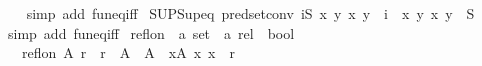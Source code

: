 \begin{isabellebody}
%
\isadelimproof
\ \ %
\endisadelimproof
%
\isatagproof
{}\isamarkupfalse%
\ {\isacharparenleft}{\kern0pt}simp\ add{\isacharcolon}{\kern0pt}\ fun{\isacharunderscore}{\kern0pt}eq{\isacharunderscore}{\kern0pt}iff{\isacharparenright}{\kern0pt}%
\endisatagproof
{\isafoldproof}%
%
\isadelimproof
\isanewline
%
\endisadelimproof
\isanewline
{}\isamarkupfalse%
\ SUP{\isacharunderscore}{\kern0pt}Sup{\isacharunderscore}{\kern0pt}eq{}\ {\isacharbrackleft}{\kern0pt}pred{\isacharunderscore}{\kern0pt}set{\isacharunderscore}{\kern0pt}conv{\isacharbrackright}{\kern0pt}{\isacharcolon}{\kern0pt}\ {\isachardoublequoteopen}{\isacharparenleft}{\kern0pt}{\isasymSqunion}i{\isasymin}S{\isachardot}{\kern0pt}\ {\isacharparenleft}{\kern0pt}{\isasymlambda}x\ y{\isachardot}{\kern0pt}\ {\isacharparenleft}{\kern0pt}x{\isacharcomma}{\kern0pt}\ y{\isacharparenright}{\kern0pt}\ {\isasymin}\ i{\isacharparenright}{\kern0pt}{\isacharparenright}{\kern0pt}\ {\isacharequal}{\kern0pt}\ {\isacharparenleft}{\kern0pt}{\isasymlambda}x\ y{\isachardot}{\kern0pt}\ {\isacharparenleft}{\kern0pt}x{\isacharcomma}{\kern0pt}\ y{\isacharparenright}{\kern0pt}\ {\isasymin}\ {\isasymUnion}S{\isacharparenright}{\kern0pt}{\isachardoublequoteclose}\isanewline
%
\isadelimproof
\ \ %
\endisadelimproof
%
\isatagproof
{}\isamarkupfalse%
\ {\isacharparenleft}{\kern0pt}simp\ add{\isacharcolon}{\kern0pt}\ fun{\isacharunderscore}{\kern0pt}eq{\isacharunderscore}{\kern0pt}iff{\isacharparenright}{\kern0pt}%
\endisatagproof
{\isafoldproof}%
%
\isadelimproof
%
\endisadelimproof
%
\isadelimdocument
%
\endisadelimdocument
%
\isatagdocument
%
\isamarkuptrue%
%
\isamarkuptrue%
%
\endisatagdocument
{\isafolddocument}%
%
\isadelimdocument
%
\endisadelimdocument
{}\isamarkupfalse%
\ refl{\isacharunderscore}{\kern0pt}on\ {\isacharcolon}{\kern0pt}{\isacharcolon}{\kern0pt}\ {\isachardoublequoteopen}{\isacharprime}{\kern0pt}a\ set\ {\isasymRightarrow}\ {\isacharprime}{\kern0pt}a\ rel\ {\isasymRightarrow}\ bool{\isachardoublequoteclose}\isanewline
\ \ \ {\isachardoublequoteopen}refl{\isacharunderscore}{\kern0pt}on\ A\ r\ {\isasymlongleftrightarrow}\ r\ {\isasymsubseteq}\ A\ {\isasymtimes}\ A\ {\isasymand}\ {\isacharparenleft}{\kern0pt}{\isasymforall}x{\isasymin}A{\isachardot}{\kern0pt}\ {\isacharparenleft}{\kern0pt}x{\isacharcomma}{\kern0pt}\ x{\isacharparenright}{\kern0pt}\ {\isasymin}\ r{\isacharparenright}{\kern0pt}{\isachardoublequoteclose}\isanewline
\isanewline

\end{isabellebody}
